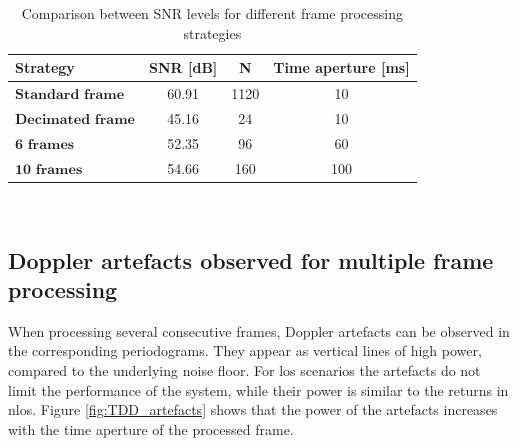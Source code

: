 		\begin{table}[H]
		    \centering 
		    \begin{tabular}{|p{9em} c c c |}
		    \hline
		    \rowcolor{bluepoli!40} %
		     \textbf{Strategy} & \textbf{SNR [dB]} & \textbf{N} & \textbf{Time aperture [ms]} \T\B \\
		    \hline \hline
		    $\textbf{Standard frame}$ & 60.91 & 1120 & 10 \T\B \\
		    $\textbf{Decimated frame}$ & 45.16 & 24 & 10 \T\B\\
		    $\textbf{6 frames}$ & 52.35 & 96 & 60  \T\B\\
		    $\textbf{10 frames}$ & 54.66 & 160 & 100  \T\B\\
		
		    \hline
		    \end{tabular}
		    \\[10pt]
		    \caption{Comparison between SNR levels for different frame processing strategies}
		    \label{table:TDDstratcomparison}
		\end{table}
		

	\subsection{Doppler artefacts observed for multiple frame processing}

		When processing several consecutive frames, Doppler artefacts can be observed in the corresponding periodograms.
		They appear as vertical lines of high power, compared to the underlying noise floor.
		For \gls{los} scenarios the artefacts do not limit the performance of the system, while their power is similar to the returns in \gls{nlos}.
		Figure \ref{fig:TDD_artefacts} shows that the power of the artefacts increases with the time aperture of the processed frame.
		
